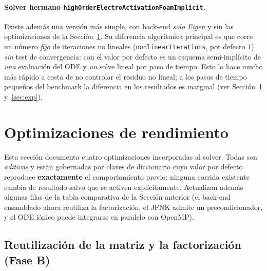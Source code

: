 \documentclass[11pt,a4paper]{article}
\newcommand{\code}[1]{\texttt{\small #1}}
\begin{document}
\paragraph{Solver hermano \code{highOrderElectroActivationFoamImplicit}.}
Existe además una versión más simple, con back-end \emph{solo Eigen} y sin las
optimizaciones de la Sección~\ref{sec:optim}. Su diferencia algorítmica principal es
que corre un número \emph{fijo} de iteraciones no lineales (\code{nonlinearIterations},
por defecto $1$) \emph{sin} test de convergencia: con el valor por defecto es un
esquema semi-implícito de \emph{una} evaluación del ODE y \emph{un} solve lineal por
paso de tiempo. Esto lo hace mucho más rápido a costa de no controlar el residuo no
lineal; a los pasos de tiempo pequeños del benchmark la diferencia en los resultados
es marginal (ver Sección~\ref{sec:optim} y~\ref{sec:exp}).

\section{Optimizaciones de rendimiento}
\label{sec:optim}

Esta sección documenta cuatro optimizaciones incorporadas al solver. Todas son
\emph{aditivas} y están gobernadas por claves de diccionario cuyo valor por
defecto reproduce \textbf{exactamente} el comportamiento previo: ninguna corrida
existente cambia de resultado salvo que se activen explícitamente. Actualizan
además algunas filas de la tabla comparativa de la Sección anterior (el back-end
ensamblado ahora reutiliza la factorización, el JFNK admite un precondicionador,
y el ODE iónico puede integrarse en paralelo con OpenMP).

\subsection{Reutilización de la matriz y la factorización (Fase B)}
\label{sec:optim-B}
\end{document}
